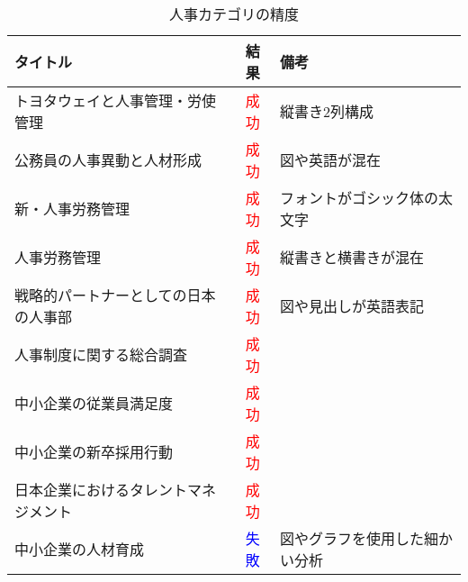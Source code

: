 \begin{table}[!htbp]
  \label{tab:doc_human}
  \caption{人事カテゴリの精度}
  \begin{center}
  \begin{tabular}{|l|c|l|}
    \hline
    \textbf{タイトル} & \textbf{結果} & \textbf{備考} \\ \hline
    トヨタウェイと人事管理・労使管理 & \textcolor{red}{成功} & 縦書き2列構成 \\ \hline
    公務員の人事異動と人材形成 & \textcolor{red}{成功} & 図や英語が混在 \\ \hline
    新・人事労務管理 & \textcolor{red}{成功} & フォントがゴシック体の太文字 \\ \hline
    人事労務管理 & \textcolor{red}{成功} & 縦書きと横書きが混在 \\ \hline
    戦略的パートナーとしての日本の人事部 & \textcolor{red}{成功} & 図や見出しが英語表記 \\ \hline
    人事制度に関する総合調査 & \textcolor{red}{成功} & \\ \hline
    中小企業の従業員満足度 & \textcolor{red}{成功} & \\ \hline
    中小企業の新卒採用行動 & \textcolor{red}{成功} & \\ \hline
    日本企業におけるタレントマネジメント & \textcolor{red}{成功} & \\ \hline
    中小企業の人材育成 & \textcolor{blue}{失敗} & 図やグラフを使用した細かい分析 \\ \hline
  \end{tabular}
  \end{center}
\end{table}

\clearpage

